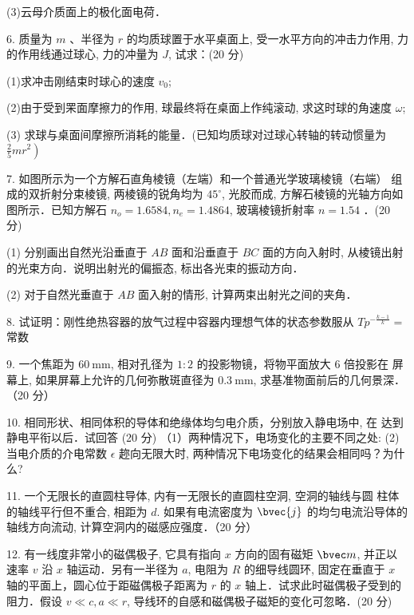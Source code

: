 (3)云母介质面上的极化面电荷．

6. 质量为 $m$ 、半径为 $r$ 的均质球置于水平桌面上, 受一水平方向的冲击力作用, 力的作用线通过球心, 力的冲量为 $J$, 试求：(20 分)

(1)求冲击刚结束时球心的速度 $v_{0}$;

(2)由于受到䍒面摩擦力的作用, 球最终将在桌面上作纯滚动, 求这时球的角速度 $\omega$;

(3) 求球与桌面间摩擦所消耗的能量．(已知均质球对过球心转轴的转动惯量为 $\left.\frac{2}{5} m r^{2}\right)$

7. 如图所示为一个方解石直角棱镜（左端）和一个普通光学玻璃棱镜（右端） 组成的双折射分束棱镜, 两棱镜的锐角均为 $45^{\circ}$, 光胶而成, 方解石棱镜的光轴方向如图所示．已知方解石 $n_{o}=1.6584, n_{e}=1.4864$, 玻璃棱镜折射率 $n=1.54$ ．(20 分)

(1) 分别画出自然光沿垂直于 $A B$ 面和沿垂直于 $B C$ 面的方向入射时, 从棱镜出射的光束方向．说明出射光的偏振态, 标出各光束的振动方向．

(2) 对于自然光垂直于 $A B$ 面入射的情形, 计算两束出射光之间的夹角．

8. 试证明：刚性绝热容器的放气过程中容器内理想气体的状态参数服从 $T p^{-\frac{k-1}{k}}=$ 常数

9. 一个焦距为 $60 \mathrm{~mm}$, 相对孔径为 $1: 2$ 的投影物镜，将物平面放大 $6$ 倍投影在 屏幕上, 如果屏幕上允许的几何弥散斑直径为 $0.3 \mathrm{~mm}$, 求基准物面前后的几何景深．
（20 分）

10. 相同形状、相同体积的导体和绝缘体均匀电介质，分别放入静电场中, 在 达到静电平衔以后．试回答
(20 分)
（1）两种情况下，电场变化的主要不同之处:
(2) 当电介质的介电常数 $\epsilon$ 趂向无限大时, 两种情况下电场变化的结果会相同吗？为什么?

11. 一个无限长的直圆柱导体, 内有一无限长的直圆柱空洞, 空洞的轴线与圆 柱体的轴线平行但不重合, 相距为 $d$. 如果有电流密度为 $\bvec{j}$ 的均匀电流沿导体的轴线方向流动, 计算空洞内的磁感应强度．（20 分）

12. 有一线度非常小的磁偶极子, 它具有指向 $x$ 方向的固有磁矩 $\bvec m$, 并正以速率 $v$ 沿 $x$ 轴运动．另有一半径为 $a$, 电阻为 $R$ 的细导线圆环, 固定在垂直于 $x$ 轴的平面上，圆心位于距磁偶极子距离为 $r$ 的 $x$ 轴上．试求此时磁偶极子受到的阻力．假设 $v \ll c, a \ll r$, 导线环的自感和磁偶极子磁矩的变化可忽略．(20 分)